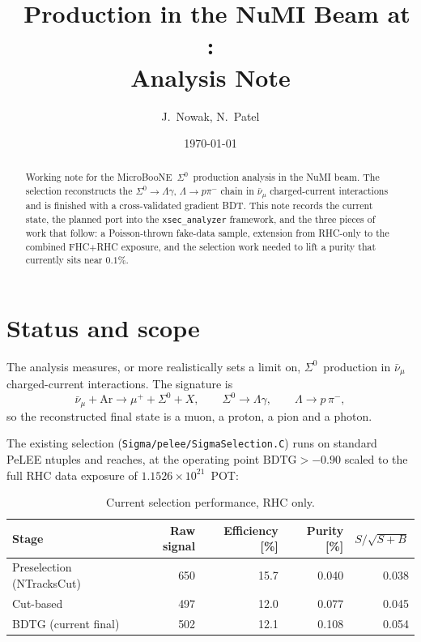 \documentclass[11pt,a4paper]{article}
\title{\Szero\ Production in the NuMI Beam at \uboone:\\ Analysis Note}
\author{J.~Nowak, N.~Patel}
\date{\today}
\newcommand{\Szero}{\ensuremath{\Sigma^{0}}}
\newcommand{\Lam}{\ensuremath{\Lambda}}
\newcommand{\uboone}{MicroBooNE}
\newcommand{\numubar}{\ensuremath{\bar{\nu}_\mu}}
\begin{document}
\maketitle

\begin{abstract}
Working note for the \uboone\ \Szero\ production analysis in the NuMI beam. The
selection reconstructs the $\Szero \to \Lam\gamma$, $\Lam \to p\pi^-$ chain in
$\numubar$ charged-current interactions and is finished with a cross-validated
gradient BDT. This note records the current state, the planned port into the
\texttt{xsec\_analyzer} framework, and the three pieces of work that follow:
a Poisson-thrown fake-data sample, extension from RHC-only to the combined
FHC$+$RHC exposure, and the selection work needed to lift a purity that currently
sits near $0.1\%$.
\end{abstract}

\tableofcontents

\section{Status and scope}

The analysis measures, or more realistically sets a limit on, \Szero\ production
in $\numubar$ charged-current interactions. The signature is
\begin{equation}
  \numubar + \mathrm{Ar} \to \mu^{+} + \Szero + X, \qquad
  \Szero \to \Lam\gamma, \qquad \Lam \to p\,\pi^{-},
\end{equation}
so the reconstructed final state is a muon, a proton, a pion and a photon.

The existing selection (\texttt{Sigma/pelee/SigmaSelection.C}) runs on standard
PeLEE ntuples and reaches, at the operating point $\mathrm{BDTG}>-0.90$ scaled to
the full RHC data exposure of $1.1526\times10^{21}$~POT:

\begin{table}[h]\centering
\caption{Current selection performance, RHC only.}
\begin{tabular}{lrrrr}
\toprule
Stage & Raw signal & Efficiency [\%] & Purity [\%] & $S/\sqrt{S+B}$ \\
\midrule
Preselection (NTracksCut) & 650 & 15.7 & 0.040 & 0.038 \\
Cut-based                 & 497 & 12.0 & 0.077 & 0.045 \\
BDTG (current final)      & 502 & 12.1 & 0.108 & 0.054 \\
\bottomrule
\end{tabular}
\end{table}
\end{document}
